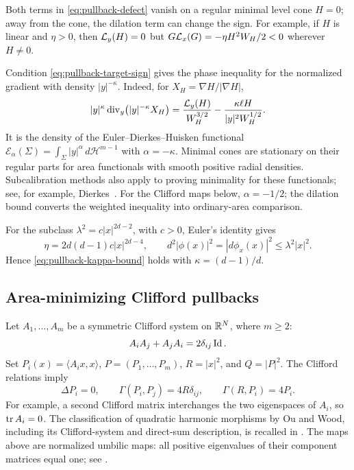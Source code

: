 Both terms in \eqref{eq:pullback-defect} vanish on a regular minimal
level cone \(H=0\); away from the cone, the dilation term can change
the sign. For example, if \(H\) is linear and
\(\eta>0\), then \(\mathcal L_y(H)=0\) but
\(G\mathcal L_x(G)=-\eta H^2W_H/2<0\) wherever \(H\ne0\).

\begin{remark}
Condition \eqref{eq:pullback-target-sign} gives the phase inequality
for the normalized gradient with density \(|y|^{-\kappa}\).
Indeed, for \(X_H=\nabla H/|\nabla H|\),
\[
 |y|^{\kappa}\operatorname{div}_y\bigl(|y|^{-\kappa}X_H\bigr)
 =\frac{\mathcal L_y(H)}{W_H^{3/2}}
       -\frac{\kappa\ell H}{|y|^2W_H^{1/2}}.
\]
It is the density of the Euler--Dierkes--Huisken functional
\(\mathcal E_\alpha(\Sigma)=\int_\Sigma |y|^\alpha\,d\mathcal H^{m-1}\)
with \(\alpha=-\kappa\).
Minimal cones are stationary on their regular parts for area functionals
with smooth positive radial densities. Subcalibration methods also apply
to proving minimality for these functionals; see, for example,
Dierkes~\cite{Dierkes26Euler}.
For the Clifford maps below, \(\alpha=-1/2\); the dilation bound
converts the weighted inequality into ordinary-area comparison.
\end{remark}

For the subclass \(\lambda^2=c|x|^{2d-2}\), with \(c>0\),
Euler's identity gives
\[
 \eta=2d(d-1)c|x|^{2d-4},\qquad
 d^2|\phi(x)|^2=|d\phi_x(x)|^2\leq\lambda^2|x|^2.
\]
Hence \eqref{eq:pullback-kappa-bound} holds with
\(\kappa=(d-1)/d\).

\subsection{Area-minimizing Clifford pullbacks}

Let \(A_1,\ldots,A_m\) be a symmetric Clifford system on \(\mathbb R^N\),
where \(m\geq2\):
\[
 A_iA_j+A_jA_i=2\delta_{ij}\operatorname{Id}.
\]
Set \(P_i(x)=\langle A_ix,x\rangle\), \(P=(P_1,\ldots,P_m)\),
\(R=|x|^2\), and \(Q=|P|^2\).  The Clifford relations imply
\begin{equation}\label{eq:Clifford-pullback-identities}
 \Delta P_i=0,\qquad
 \Gamma(P_i,P_j)=4R\delta_{ij},\qquad
 \Gamma(R,P_i)=4P_i.
\end{equation}
For example, a second Clifford matrix interchanges the two eigenspaces
of \(A_i\), so \(\operatorname{tr} A_i=0\). The classification of quadratic
harmonic morphisms by Ou and Wood, including its Clifford-system
and direct-sum description, is recalled in
\cite[Theorem~4.5.3 and Remark~4.5.5]{RiedlerThesis25}.
The maps above are normalized umbilic maps: all positive eigenvalues
of their component matrices equal one; see
\cite[Remark~5.1.12]{RiedlerThesis25}.

